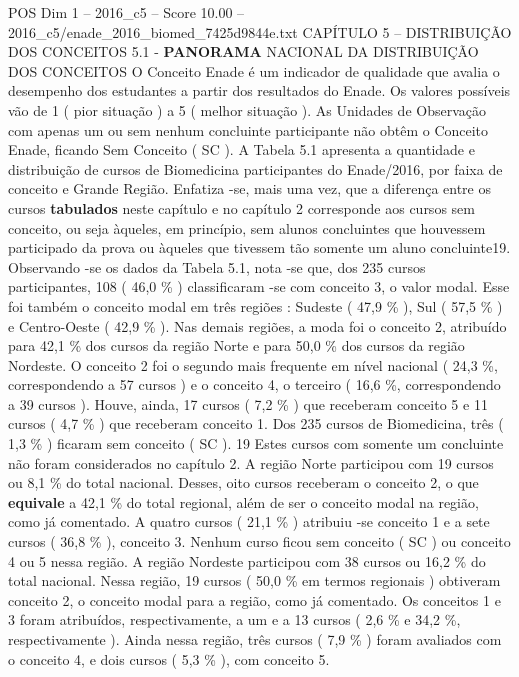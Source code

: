 \begin{textsample}{POS Dim 1 – 2016\_c5 – Score 10.00 – 2016\_c5/enade\_2016\_biomed\_7425d9844e.txt}  \label{ex:f1_pos_074}
CAPÍTULO 5 – DISTRIBUIÇÃO DOS CONCEITOS 5.1 - \textbf{PANORAMA} NACIONAL DA DISTRIBUIÇÃO DOS CONCEITOS O Conceito Enade é um indicador de qualidade que avalia o desempenho dos estudantes a partir dos resultados do Enade.
Os valores possíveis vão de 1 ( pior situação ) a 5 ( melhor situação ).
As Unidades de Observação com apenas um ou sem nenhum concluinte participante não obtêm o Conceito Enade, ficando Sem Conceito ( SC ).
A Tabela 5.1 apresenta a quantidade e distribuição de cursos de Biomedicina participantes do Enade/2016, por faixa de conceito e Grande Região.
Enfatiza -se, mais uma vez, que a diferença entre os cursos \textbf{tabulados} neste capítulo e no capítulo 2 corresponde aos cursos sem conceito, ou seja àqueles, em princípio, sem alunos concluintes que houvessem participado da prova ou àqueles que tivessem tão somente um aluno concluinte19.
Observando -se os dados da Tabela 5.1, nota -se que, dos 235 cursos participantes, 108 ( 46,0 \% ) classificaram -se com conceito 3, o valor modal.
Esse foi também o conceito modal em três regiões : Sudeste ( 47,9 \% ), Sul ( 57,5 \% ) e Centro-Oeste ( 42,9 \% ).
Nas demais regiões, a moda foi o conceito 2, atribuído para 42,1 \% dos cursos da região Norte e para 50,0 \% dos cursos da região Nordeste.
O conceito 2 foi o segundo mais frequente em nível nacional ( 24,3 \%, correspondendo a 57 cursos ) e o conceito 4, o terceiro ( 16,6 \%, correspondendo a 39 cursos ).
Houve, ainda, 17 cursos ( 7,2 \% ) que receberam conceito 5 e 11 cursos ( 4,7 \% ) que receberam conceito 1.
Dos 235 cursos de Biomedicina, três ( 1,3 \% ) ficaram sem conceito ( SC ). 19 Estes cursos com somente um concluinte não foram considerados no capítulo 2.
A região Norte participou com 19 cursos ou 8,1 \% do total nacional.
Desses, oito cursos receberam o conceito 2, o que \textbf{equivale} a 42,1 \% do total regional, além de ser o conceito modal na região, como já comentado.
A quatro cursos ( 21,1 \% ) atribuiu -se conceito 1 e a sete cursos ( 36,8 \% ), conceito 3.
Nenhum curso ficou sem conceito ( SC ) ou conceito 4 ou 5 nessa região.
A região Nordeste participou com 38 cursos ou 16,2 \% do total nacional.
Nessa região, 19 cursos ( 50,0 \% em termos regionais ) obtiveram conceito 2, o conceito modal para a região, como já comentado.
Os conceitos 1 e 3 foram atribuídos, respectivamente, a um e a 13 cursos ( 2,6 \% e 34,2 \%, respectivamente ).
Ainda nessa região, três cursos ( 7,9 \% ) foram avaliados com o conceito 4, e dois cursos ( 5,3 \% ), com conceito 5.

\end{textsample}

